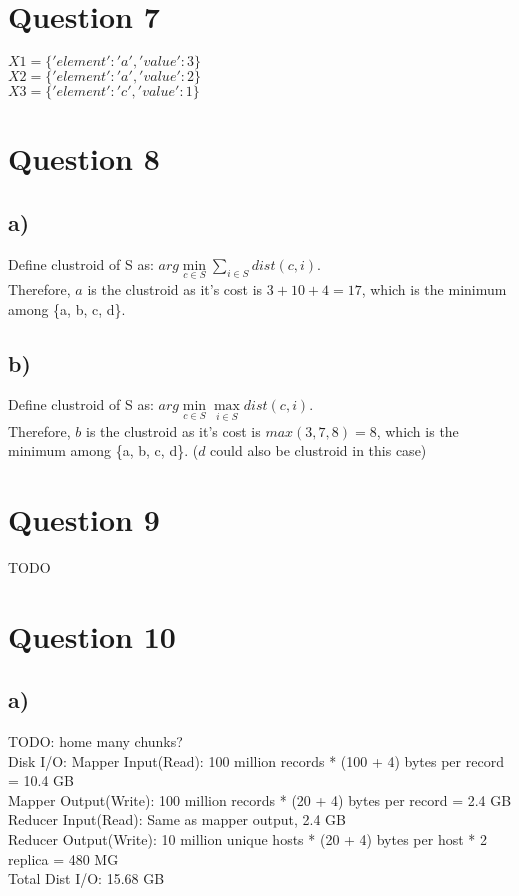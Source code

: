 \documentclass{article}
\begin{document}
\section{Question 7}
$X1 = \{'element': 'a', 'value': 3\} $\\
$X2 = \{'element': 'a', 'value': 2\} $\\
$X3 = \{'element': 'c', 'value': 1\} $

\section{Question 8}
\subsection{a)}
Define clustroid of S as: $arg\min\limits_{c\in S}\sum\limits_{i\in S}dist(c, i)$. \\
Therefore, $a$ is the clustroid as it's cost is $3+10+4=17$, which is the minimum among \{a, b, c, d\}.

\subsection{b)}
Define clustroid of S as: $arg\min\limits_{c\in S}\max\limits_{i\in S}dist(c, i)$. \\
Therefore, $b$ is the clustroid as it's cost is $max(3, 7, 8)=8$, which is the minimum among \{a, b, c, d\}. ($d$ could also be clustroid in this case)

\section{Question 9}
TODO

\section{Question 10}
\subsection{a)}
TODO: home many chunks? \\
Disk I/O: 
Mapper Input(Read): 100 million records * (100 + 4) bytes per record = 10.4 GB \\
Mapper Output(Write): 100 million records * (20 + 4) bytes per record = 2.4 GB \\
Reducer Input(Read): Same as mapper output, 2.4 GB \\
Reducer Output(Write): 10 million unique hosts *  (20 + 4) bytes per host * 2 replica = 480 MG \\
Total Dist I/O: 15.68 GB \\
\end{document}

